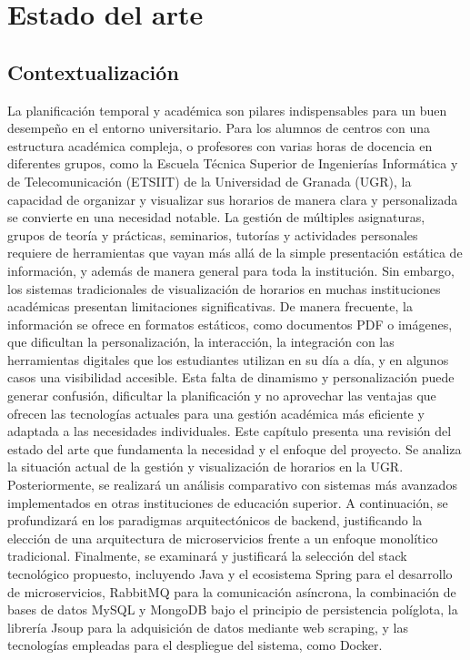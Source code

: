 \chapter{Estado del arte}\label{cap:estado}

\section{Contextualización}

La planificación temporal y académica son pilares indispensables para un buen desempeño en el entorno universitario. Para los alumnos de centros con una estructura académica compleja, o profesores con varias horas de docencia en diferentes grupos, como la Escuela Técnica Superior de Ingenierías Informática y de Telecomunicación (ETSIIT) de la Universidad de Granada (UGR), la capacidad de organizar y visualizar sus horarios de manera clara y personalizada se convierte en una necesidad notable.
\newline\newline
La gestión de múltiples asignaturas, grupos de teoría y prácticas, seminarios, tutorías y actividades personales requiere de herramientas que vayan más allá de la simple presentación estática de información, y además de manera general para toda la institución.
\newline\newline
Sin embargo, los sistemas tradicionales de visualización de horarios en muchas instituciones académicas presentan limitaciones significativas. De manera frecuente, la información se ofrece en formatos estáticos, como documentos PDF o imágenes, que dificultan la personalización, la interacción, la integración con las herramientas digitales que los estudiantes utilizan en su día a día, y en algunos casos una visibilidad accesible.
\newline\newline
Esta falta de dinamismo y personalización puede generar confusión, dificultar la planificación y no aprovechar las ventajas que ofrecen las tecnologías actuales para una gestión académica más eficiente y adaptada a las necesidades individuales.
\newline\newline
Este capítulo presenta una revisión del estado del arte que fundamenta la necesidad y el enfoque del proyecto. Se analiza la situación actual de la gestión y visualización de horarios en la UGR. 
Posteriormente, se realizará un análisis comparativo con sistemas más avanzados implementados en otras instituciones de educación superior. A continuación, se profundizará en los paradigmas arquitectónicos de backend, justificando la elección de una arquitectura de microservicios frente a un enfoque monolítico tradicional. Finalmente, se examinará y justificará la selección del stack tecnológico propuesto, incluyendo Java y el ecosistema Spring para el desarrollo de microservicios, RabbitMQ para la comunicación asíncrona, la combinación de bases de datos MySQL y MongoDB bajo el principio de persistencia políglota, la librería Jsoup para la adquisición de datos mediante web scraping, y las tecnologías empleadas para el despliegue del sistema, como Docker.

